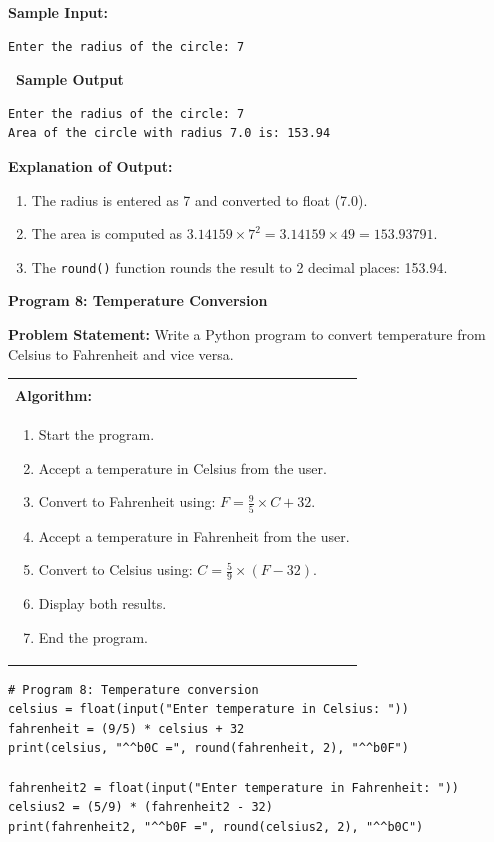 \documentclass[12pt,a4paper]{article}
\makeatletter
\newcommand{\outhead}{\noindent\colorbox{cmrgreen!25}%
  {\textbf{\small\color{cmrdark}~Sample Output~}}\par\vspace{-1pt}}
\newenvironment{algobox}{%
  \par\vspace{4pt}%
  \noindent\begin{tabular}{@{}p{\linewidth}@{}}%
  \hline\\[-8pt]%
  \textbf{\color{blue!60!black}\small Algorithm:}\\[2pt]%
}{%
  \\[-4pt]\hline%
  \end{tabular}\par\vspace{4pt}%
}
\makeatother
\begin{document}
\textbf{Sample Input:}
\begin{verbatim}
Enter the radius of the circle: 7
\end{verbatim}

\outhead
\begin{lstlisting}[style=outputstyle]
Enter the radius of the circle: 7
Area of the circle with radius 7.0 is: 153.94
\end{lstlisting}

\textbf{Explanation of Output:}
\begin{enumerate}
  \item The radius is entered as 7 and converted to float (7.0).
  \item The area is computed as $3.14159 \times 7^2 = 3.14159 \times 49 = 153.93791$.
  \item The \texttt{round()} function rounds the result to 2 decimal places: 153.94.
\end{enumerate}

\vspace{0.5cm}

\textbf{Program 8: Temperature Conversion}

\textbf{Problem Statement:}
Write a Python program to convert temperature from Celsius to Fahrenheit and vice versa.

\begin{algobox}
\begin{enumerate}[label=Step \arabic*:]
  \item Start the program.
  \item Accept a temperature in Celsius from the user.
  \item Convert to Fahrenheit using: $F = \frac{9}{5} \times C + 32$.
  \item Accept a temperature in Fahrenheit from the user.
  \item Convert to Celsius using: $C = \frac{5}{9} \times (F - 32)$.
  \item Display both results.
  \item End the program.
\end{enumerate}
\end{algobox}

\begin{lstlisting}
# Program 8: Temperature conversion
celsius = float(input("Enter temperature in Celsius: "))
fahrenheit = (9/5) * celsius + 32
print(celsius, "^^b0C =", round(fahrenheit, 2), "^^b0F")

fahrenheit2 = float(input("Enter temperature in Fahrenheit: "))
celsius2 = (5/9) * (fahrenheit2 - 32)
print(fahrenheit2, "^^b0F =", round(celsius2, 2), "^^b0C")
\end{lstlisting}
\end{document}
